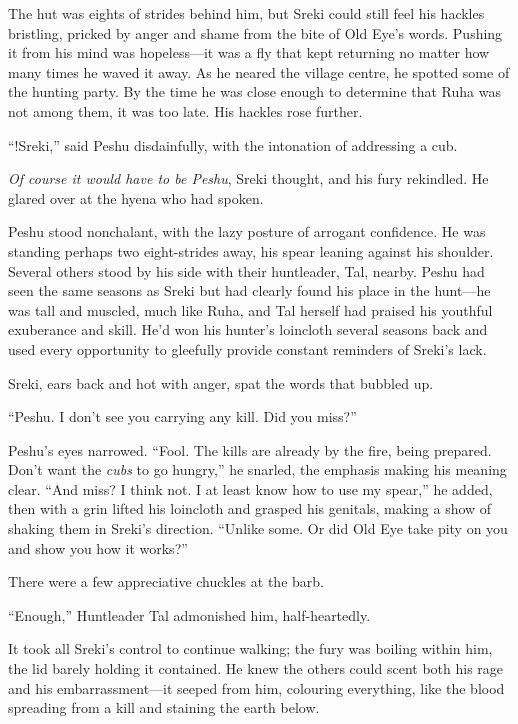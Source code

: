 \secdiv

The hut was eights of strides behind him, but Sreki could still feel his hackles bristling, pricked by anger and shame from the bite of Old Eye's words. Pushing it from his mind was hopeless---it was a fly that kept returning no matter how many times he waved it away. As he neared the village centre, he spotted some of the hunting party. By the time he was close enough to determine that Ruha was not among them, it was too late. His hackles rose further.

``!Sreki,'' said Peshu disdainfully, with the intonation of addressing a cub.

\emph{Of course it would have to be Peshu}, Sreki thought, and his fury rekindled. He glared over at the hyena who had spoken.

Peshu stood nonchalant, with the lazy posture of arrogant confidence. He was standing perhaps two eight-strides away, his spear leaning against his shoulder. Several others stood by his side with their huntleader, Tal, nearby. Peshu had seen the same seasons as Sreki but had clearly found his place in the hunt---he was tall and muscled, much like Ruha, and Tal herself had praised his youthful exuberance and skill. He'd won his hunter's loincloth several seasons back and used every opportunity to gleefully provide constant reminders of Sreki's lack.

Sreki, ears back and hot with anger, spat the words that bubbled up.

``Peshu. I don't see you carrying any kill. Did you miss?''

Peshu's eyes narrowed. ``Fool. The kills are already by the fire, being prepared. Don't want the \emph{cubs} to go hungry,'' he snarled, the emphasis making his meaning clear. ``And miss? I think not. I at least know how to use my spear,'' he added, then with a grin lifted his loincloth and grasped his genitals, making a show of shaking them in Sreki's direction. ``Unlike some. Or did Old Eye take pity on you and show you how it works?''

There were a few appreciative chuckles at the barb.

``Enough,'' Huntleader Tal admonished him, half-heartedly.

It took all Sreki's control to continue walking; the fury was boiling within him, the lid barely holding it contained. He knew the others could scent both his rage and his embarrassment---it seeped from him, colouring everything, like the blood spreading from a kill and staining the earth below.

